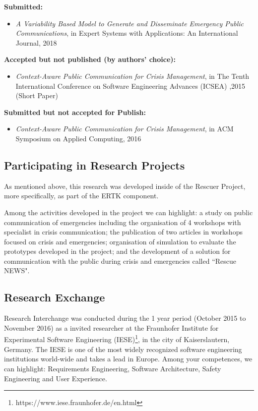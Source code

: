 \textbf{Submitted:}

\begin{itemize}
   \item \emph{A Variability Based Model to Generate and Disseminate Emergency Public Communications}, in Expert Systems with Applications: An International Journal, 2018 
\end{itemize}

\textbf{Accepted but not published (by authors' choice):}

\begin{itemize}
   \item \emph{Context-Aware Public Communication for Crisis Management}, in The Tenth International Conference on Software Engineering Advances (ICSEA) ,2015 (Short Paper)
\end{itemize}

\textbf{Submitted but not accepted for Publish:}

\begin{itemize}
   \item \emph{Context-Aware Public Communication for Crisis Management}, in ACM Symposium on Applied Computing, 2016 
\end{itemize}


\subsection{Participating in Research Projects}

As mentioned above, this research was developed inside of the Rescuer Project, more specifically, as part of the ERTK component. 

Among the activities developed in the project we can highlight: a study on public communication of emergencies including the organisation of 4 workshops with specialist in crisis communication; the publication of two articles in workshops focused on crisis and emergencies; organisation of simulation to evaluate the prototypes developed in the project; and the development of a solution for communication with the public during crisis and emergencies called ``Rescue NEWS". 


\subsection{Research Exchange}

Research Interchange was conducted during the 1 year period (October 2015 to November 2016) as a invited researcher at the Fraunhofer Institute for Experimental Software Engineering (IESE)\footnote{https://www.iese.fraunhofer.de/en.html}, in the city of Kaiserslautern, Germany. The IESE is one of the most widely recognized software engineering institutions world-wide and takes a lead in Europe. Among your competences, we can highlight: Requirements Engineering,  Software Architecture, Safety Engineering and User Experience.

